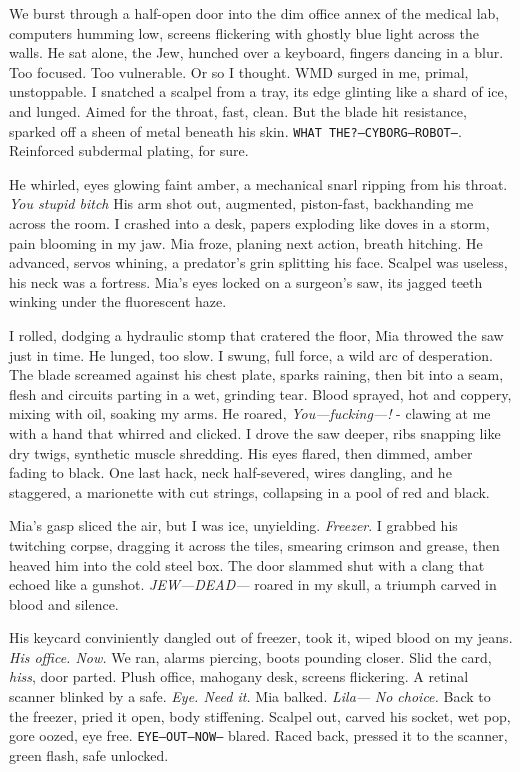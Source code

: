 \documentclass[12pt,oneside]{book}
\newcommand{\note}[1]{\texttt{#1}}
\begin{document}
We burst through a half-open door into the dim office annex of the medical lab, computers humming low, screens flickering with ghostly blue light across the walls. He sat alone, the Jew, hunched over a keyboard, fingers dancing in a blur. Too focused. Too vulnerable. Or so I thought. WMD surged in me, primal, unstoppable. I snatched a scalpel from a tray, its edge glinting like a shard of ice, and lunged. Aimed for the throat, fast, clean. But the blade hit resistance, sparked off a sheen of metal beneath his skin. \note{WHAT THE?—CYBORG—ROBOT—}. Reinforced subdermal plating, for sure.

He whirled, eyes glowing faint amber, a mechanical snarl ripping from his throat. \textit{You stupid bitch} His arm shot out, augmented, piston-fast, backhanding me across the room. I crashed into a desk, papers exploding like doves in a storm, pain blooming in my jaw. Mia froze, planing next action, breath hitching. He advanced, servos whining, a predator’s grin splitting his face. Scalpel was useless, his neck was a fortress. Mia's eyes locked on a surgeon’s saw, its jagged teeth winking under the fluorescent haze. 

I rolled, dodging a hydraulic stomp that cratered the floor, Mia throwed the saw just in time. He lunged, too slow. I swung, full force, a wild arc of desperation. The blade screamed against his chest plate, sparks raining, then bit into a seam, flesh and circuits parting in a wet, grinding tear. Blood sprayed, hot and coppery, mixing with oil, soaking my arms. He roared, \textit{You—fucking—!} - clawing at me with a hand that whirred and clicked. I drove the saw deeper, ribs snapping like dry twigs, synthetic muscle shredding. His eyes flared, then dimmed, amber fading to black. One last hack, neck half-severed, wires dangling, and he staggered, a marionette with cut strings, collapsing in a pool of red and black.

Mia’s gasp sliced the air, but I was ice, unyielding. \textit{Freezer}. I grabbed his twitching corpse, dragging it across the tiles, smearing crimson and grease, then heaved him into the cold steel box. The door slammed shut with a clang that echoed like a gunshot. \textit{JEW—DEAD—} roared in my skull, a triumph carved in blood and silence.

His keycard conviniently dangled out of freezer, took it, wiped blood on my jeans. \textit{His office. Now.} We ran, alarms piercing, boots pounding closer. Slid the card, \textit{hiss}, door parted. Plush office, mahogany desk, screens flickering. A retinal scanner blinked by a safe. 
\textit{Eye. Need it.} Mia balked. \textit{Lila—} 
\textit{No choice.} Back to the freezer, pried it open, body stiffening. Scalpel out, carved his socket, wet pop, gore oozed, eye free. \note{EYE—OUT—NOW—} blared. Raced back, pressed it to the scanner, green flash, safe unlocked.
\end{document}
